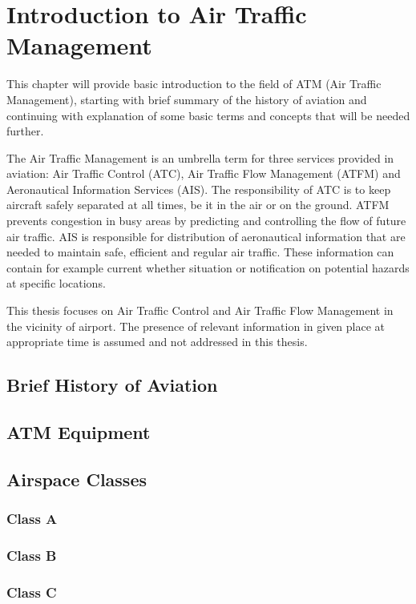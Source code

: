 \chapter{Introduction to Air Traffic Management}

This chapter will provide basic introduction to the field of ATM (Air Traffic Management), starting with brief summary of the history of aviation and continuing with explanation of some basic terms and concepts that will be needed further.

The Air Traffic Management is an umbrella term for three services provided in aviation: Air Traffic Control (ATC), Air Traffic Flow Management (ATFM) and Aeronautical Information Services (AIS). The responsibility of ATC is to keep aircraft safely separated at all times, be it in the air or on the ground. ATFM prevents congestion in busy areas by predicting and controlling the flow of future air traffic. AIS is responsible for distribution of aeronautical information that are needed to maintain safe, efficient and regular air traffic. These information can contain for example current whether situation or notification on potential hazards at specific locations. \cite{atm}

This thesis focuses on Air Traffic Control and Air Traffic Flow Management in the vicinity of airport. The presence of relevant information in given place at appropriate time is assumed and not addressed in this thesis.

\section{Brief History of Aviation}
\cite{nolan}

\section{ATM Equipment}

\section{Airspace Classes}
\subsection{Class A}
\subsection{Class B}
\subsection{Class C}
